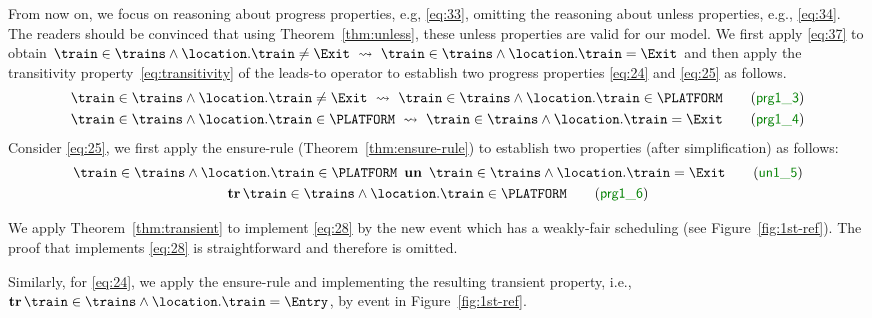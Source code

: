 From now on, we focus on reasoning about progress properties, e.g,
\ref{eq:33}, omitting the reasoning about unless properties, e.g.,
\ref{eq:34}.  The readers should be convinced that using
Theorem~\ref{thm:unless}, these unless properties are valid for our
model.  We first apply \eqref{eq:37} to obtain $\train \in \trains
\land \location.\train \neq \Exit ~\leadsto~ \train \in \trains \land
\location.\train = \Exit$ and then apply the transitivity
property~\eqref{eq:transitivity} of the leads-to operator to establish
two progress properties \ref{eq:24} and \ref{eq:25} as follows.
\begin{gather}
  \label{eq:24}
  \train \in \trains \land \location.\train
  \neq \Exit ~\leadsto~ \train \in
  \trains \land \location.\train \in \PLATFORM
  \tag{\Binv{prg1\_3}}\\
  \label{eq:25}
  \train \in \trains \land \location.\train
  \in \PLATFORM ~\leadsto~ \train \in
  \trains \land \location.\train = \Exit
  \tag{\Binv{prg1\_4}}
\end{gather}
Consider \ref{eq:25}, we first apply the ensure-rule
(Theorem~\ref{thm:ensure-rule}) to establish two properties (after
simplification) as follows:
\begin{gather}
  \label{eq:27}
  \train \in \trains \land \location.\train \in \PLATFORM ~\un~
  \train \in \trains \land \location.\train = \Exit
  \tag{\Binv{un1\_5}}\\
  \label{eq:28}
  \tr \train \in \trains \land \location.\train \in
    \PLATFORM
  \tag{\Binv{prg1\_6}}
\end{gather}

We apply Theorem~\ref{thm:transient} to implement \ref{eq:28} by the
new event \moveout which has a weakly-fair scheduling (see
Figure~\ref{fig:1st-ref}).
The proof that \moveout implements \ref{eq:28} is straightforward and
therefore is omitted.

Similarly, for \ref{eq:24}, we apply the ensure-rule and implementing
the resulting transient property, i.e., $\tr \train \in \trains \land
\location.\train = \Entry$, by event \movein in Figure~\ref{fig:1st-ref}.

